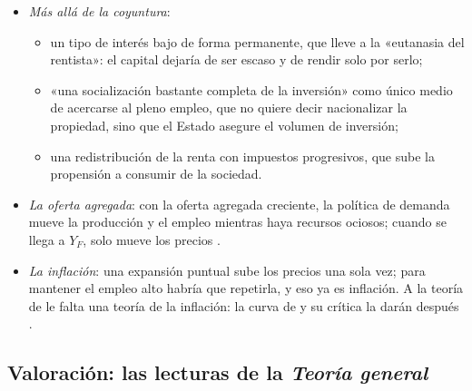 \documentclass[11pt]{article}
\begin{document}
\begin{itemize}
\item \emph{Más allá de la coyuntura}\nocite{Keynes1936}:
  \begin{itemize}
  \item un tipo de interés bajo de forma permanente, que lleve a la «eutanasia del rentista»: el capital dejaría de ser escaso y de rendir solo por serlo;
  \item «una socialización bastante completa de la inversión» como único medio de acercarse al pleno empleo\nocite{Keynes1936}, que no quiere decir nacionalizar la propiedad, sino que el Estado asegure el volumen de inversión;
  \item una redistribución de la renta con impuestos progresivos, que sube la propensión a consumir de la sociedad.
  \end{itemize}
\item \emph{La oferta agregada}: con la oferta agregada creciente, la política de demanda mueve la producción y el empleo mientras haya recursos ociosos; cuando se llega a $Y_F$, solo mueve los precios .
\item \emph{La inflación}: una expansión puntual sube los precios una sola vez; para mantener el empleo alto habría que repetirla, y eso ya es inflación. A la teoría de  le falta una teoría de la inflación: la curva de  y su crítica la darán después  .
\end{itemize}

\subsection{Valoración: las lecturas de la \emph{Teoría general}}\label{sec:lecturas}
\end{document}
